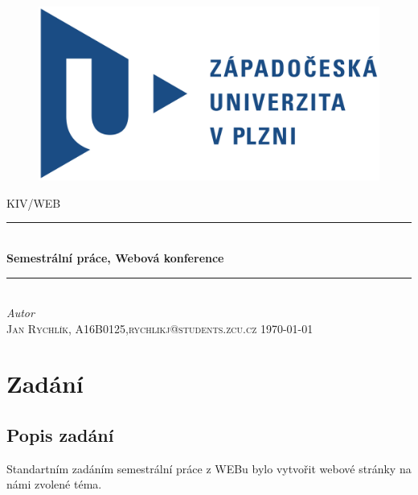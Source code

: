 \documentclass[12pt]{report}
\begin{document}
\begin{titlepage} 
\begin{figure}[!ht] %
\includegraphics[width=.4\textwidth]{logo.png}
\label{fig: sez} %
\end{figure}
	\newcommand{\HRule}{\rule{\linewidth}{0.5mm}} 	
	\center 
	\textsc{\Large KIV/WEB}\\[0.5cm] 
	\HRule\\[0.4cm]
	
	{\huge\bfseries Semestrální práce, Webová konference}\\[0.4cm]
	
	\HRule\\[1.5cm]
	{\large\textit{Autor}}\\
	 \textsc{Jan Rychlík, A16B0125,rychlikj@students.zcu.cz} 
	\vfill\vfill\vfill 
	{\large\today} 
	\vfill 
	
\end{titlepage}
\tableofcontents
\chapter{Zadání}
\section{Popis zadání}
Standartním zadáním semestrální práce z WEBu bylo vytvořit webové stránky na námi zvolené téma. 
\end{document}
